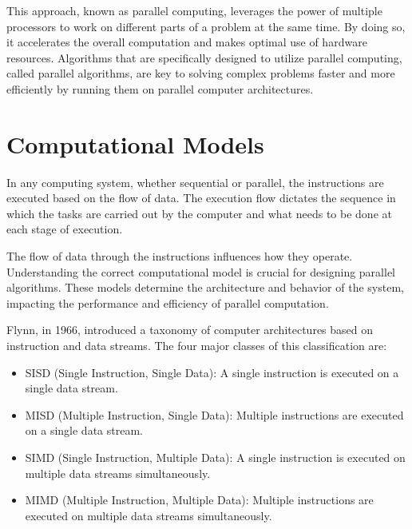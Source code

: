 \documentclass[a4paper, 10pt]{book}
\begin{document}
        This approach, known as parallel computing, leverages the power of multiple processors to work on different parts of a problem at the same time. By doing so, it accelerates the overall computation and makes optimal use of hardware resources. Algorithms that are specifically designed to utilize parallel computing, called parallel algorithms, are key to solving complex problems faster and more efficiently by running them on parallel computer architectures.

        \section{Computational Models}

            In any computing system, whether sequential or parallel, the instructions are executed based on the flow of data. The execution flow dictates the sequence in which the tasks are carried out by the computer and what needs to be done at each stage of execution.

            The flow of data through the instructions influences how they operate. Understanding the correct computational model is crucial for designing parallel algorithms. These models determine the architecture and behavior of the system, impacting the performance and efficiency of parallel computation.

            Flynn, in 1966, introduced a taxonomy of computer architectures based on instruction and data streams. The four major classes of this classification are:

            \begin{itemize}
                
                \item {\bold SISD (Single Instruction, Single Data):} A single instruction is executed on a single data stream.
                
                \item {\bold MISD (Multiple Instruction, Single Data):} Multiple instructions are executed on a single data stream.

                \item {\bold SIMD (Single Instruction, Multiple Data):} A single instruction is executed on multiple data streams simultaneously.

                \item {\bold MIMD (Multiple Instruction, Multiple Data):} Multiple instructions are executed on multiple data streams simultaneously.

            \end{itemize}
\end{document}
